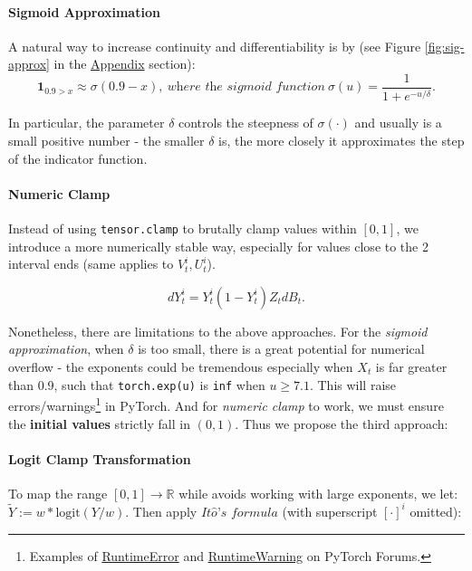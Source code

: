 \documentclass[a4paper,10pt]{article}
\newcommand{\1}{\mathbf{1}}
\begin{document}
\paragraph{Sigmoid Approximation} A natural way to increase continuity and differentiability is by (see Figure \ref{fig:sig-approx} in the \hyperlink{Algorithms}{Appendix} section):
\begin{equation}
    \1_{0.9>x} \approx \sigma(0.9-x), ~\textit{where the sigmoid function}~\sigma(u)=\frac{1}{1+e^{-u/\delta}}.
\end{equation}

In particular, the parameter \(\delta\) controls the steepness of
\(\sigma(\cdot)\) and usually is a small positive number - the smaller
\(\delta\) is, the more closely it approximates the step of the indicator function. 

\paragraph{Numeric Clamp} Instead of using \texttt{tensor.clamp} to brutally clamp values within \([0,1]\), we introduce a more numerically stable way, especially for values close to the 2 interval ends (same applies to \(V_t^i, U_t^i\)).

\begin{equation}\label{dY_tilde}
    dY_t^i=Y_t^i(1-Y_t^i)Z_tdB_t.
\end{equation}

Nonetheless, there are limitations to the above approaches. For the \textit{sigmoid approximation}, when \(\delta\) is too small, there is a great potential for numerical overflow - the exponents could be tremendous especially when \(X_t\) is far greater than 0.9, such that \texttt{torch.exp(u)} is \texttt{inf} when
$u \ge 7.1$. This will raise errors/warnings\footnote{Examples of
  \href{https://discuss.pytorch.org/t/second-order-derivative-with-nan-value-runtimeerror-function-sigmoidbackwardbackward0-returned-nan-values-in-its-0th-output/173260}{RuntimeError}
  and
  \href{https://discuss.pytorch.org/t/output-overflow-and-unstablity-when-use-model-eval/3668}{RuntimeWarning}
  on PyTorch Forums.} in PyTorch. And for \textit{numeric clamp} to work, we must ensure the \textbf{initial values} strictly fall in \((0,1)\). Thus we propose the third approach:

\paragraph{Logit Clamp Transformation} To map the range $[0,1] \to \mathbb{R}$ while avoids working with large exponents, we let:
$\tilde{Y} := w*\text{logit} (Y/w)$. Then apply \(\textit{It}\hat{o} \textit{'s formula}\) (with
superscript \([\cdot]^i\) omitted):
\end{document}
